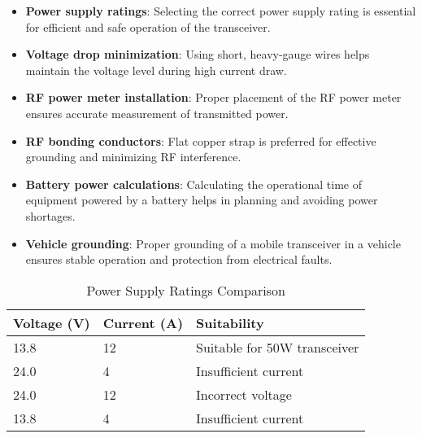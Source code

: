 \begin{itemize}
    \item \textbf{Power supply ratings}: Selecting the correct power supply rating is essential for efficient and safe operation of the transceiver.
    \item \textbf{Voltage drop minimization}: Using short, heavy-gauge wires helps maintain the voltage level during high current draw.
    \item \textbf{RF power meter installation}: Proper placement of the RF power meter ensures accurate measurement of transmitted power.
    \item \textbf{RF bonding conductors}: Flat copper strap is preferred for effective grounding and minimizing RF interference.
    \item \textbf{Battery power calculations}: Calculating the operational time of equipment powered by a battery helps in planning and avoiding power shortages.
    \item \textbf{Vehicle grounding}: Proper grounding of a mobile transceiver in a vehicle ensures stable operation and protection from electrical faults.
\end{itemize}

\begin{table}[h]
    \centering
    \caption{Power Supply Ratings Comparison}
    \label{tab:power_supply_ratings}
    \begin{tabular}{|l|l|l|}
        \hline
        \textbf{Voltage (V)} & \textbf{Current (A)} & \textbf{Suitability} \\
        \hline
        13.8 & 12 & Suitable for 50W transceiver \\
        24.0 & 4 & Insufficient current \\
        24.0 & 12 & Incorrect voltage \\
        13.8 & 4 & Insufficient current \\
        \hline
    \end{tabular}
\end{table}
